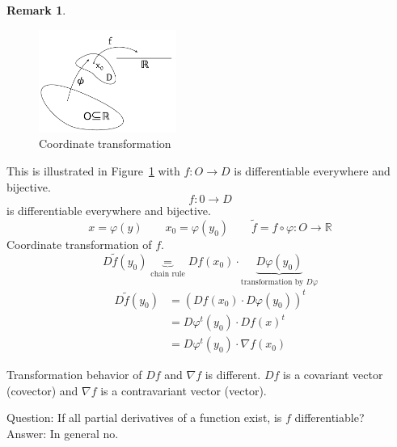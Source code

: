 \documentclass[a4paper,landscape,twocolumn]{article}
\theoremstyle{definition}
\newtheorem{rem}{Remark}
\begin{document}
\begin{rem}
  \begin{figure}[h]
    \begin{center}
      \includegraphics[width=0.4\textwidth]{img/coordinate_transformation.pdf}
      \caption{Coordinate transformation}
      \label{img:coordtrans}
    \end{center}
  \end{figure}
  This is illustrated in Figure~\ref{img:coordtrans} with $f: O \to D$ is differentiable everywhere and bijective.
  \[ f: 0 \to D \]
  is differentiable everywhere and bijective.
  \[ x = \varphi(y) \qquad x_0 = \varphi(y_0) \qquad \tilde{f} = f \circ \varphi: O \to \mathbb R \]
  Coordinate transformation of $f$.
  \[ D\tilde{f}(y_0) \underbrace{=}_{\text{chain rule}} Df(x_0) \cdot \underbrace{D\varphi(y_0)}_{\text{transformation by $D\varphi$}} \]
  \begin{align*}
    D\tilde{f}(y_0) &= \left(Df(x_0) \cdot D\varphi(y_0)\right)^t \\
    &= D\varphi^t(y_0) \cdot Df(x)^t \\
    &= D\varphi^t(y_0) \cdot \nabla f(x_0)
  \end{align*}


  Transformation behavior of $Df$ and $\nabla f$ is different.
  $Df$ is a covariant vector (covector) and $\nabla f$ is a contravariant vector (vector).
\end{rem}

Question: If all partial derivatives of a function exist, is $f$ differentiable? \\
Answer: In general no.
\end{document}
